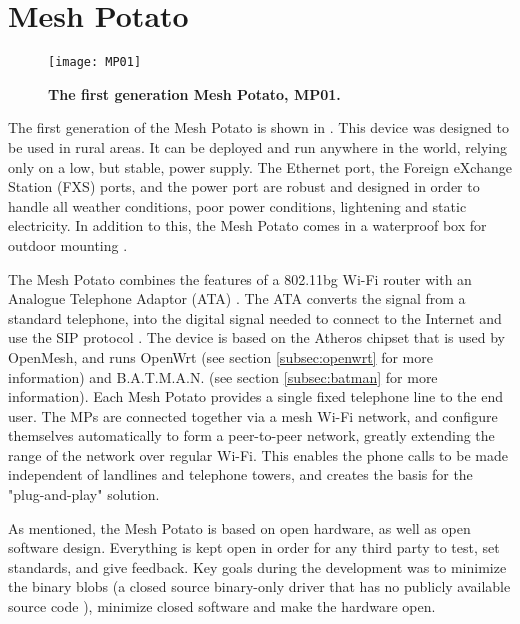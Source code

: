 \section{Mesh Potato}

\begin{figure}[b]
  \centering
      \texttt{[image: MP01]}
  \caption [MP01]{\textbf{The first generation Mesh Potato, MP01.}}
  \label{fig:MP01}
\end{figure}

The first generation of the Mesh Potato is shown in . This device was designed to be used in rural areas. It can be deployed and run anywhere in the world, relying only on a low, but stable, power supply. The Ethernet port, the Foreign eXchange Station (FXS) ports, and the power port are robust and designed in order to handle all weather conditions, poor power conditions, lightening and static electricity. In addition to this, the Mesh Potato comes in a waterproof box for outdoor mounting \cite{background}.

The Mesh Potato combines the features of a 802.11bg Wi-Fi router with an Analogue Telephone Adaptor (ATA) \cite{MP}. The ATA converts the signal from a standard telephone, into the digital signal needed to connect to the Internet and use the SIP protocol \cite{MParticle}. The device is based on the Atheros chipset that is used by OpenMesh, and runs OpenWrt (see section \ref{subsec:openwrt} for more information) and B.A.T.M.A.N. (see section \ref{subsec:batman} for more information). Each Mesh Potato provides a single fixed telephone line to the end user. The MPs are connected together via a mesh Wi-Fi network, and configure themselves automatically to form a peer-to-peer network, greatly extending the range of the network over regular Wi-Fi. This enables the phone calls to be made independent of landlines and telephone towers, and creates the basis for the "plug-and-play" solution. 

As mentioned, the Mesh Potato is based on open hardware, as well as open software design. Everything is kept open in order for any third party to test, set standards, and give feedback. Key goals during the development was to minimize the binary blobs (a closed source binary-only driver that has no publicly available source code \cite{binaryBolb}), minimize closed software and make the hardware open. 

